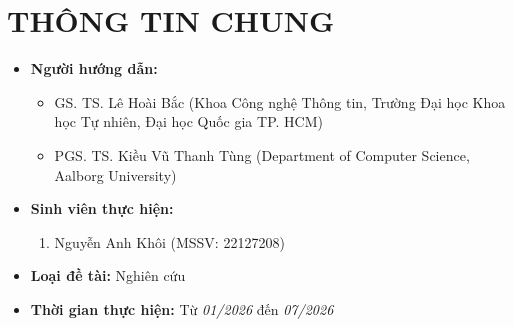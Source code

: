 \section{THÔNG TIN CHUNG}
\begin{itemize}[label = {}]
    
    \item \textbf{Người hướng dẫn:} 
    \begin{itemize}
        \item GS. TS. Lê Hoài Bắc (Khoa Công nghệ Thông tin, Trường Đại học Khoa học Tự nhiên, Đại học Quốc gia TP. HCM)
        \item PGS. TS. Kiều Vũ Thanh Tùng (Department of Computer Science, Aalborg University)
    \end{itemize}{}

    
    \item \textbf{Sinh viên thực hiện:}
    
    \begin{enumerate}
    
        \item Nguyễn Anh Khôi (MSSV: 22127208)
    \end{enumerate}

    \item \textbf{Loại đề tài:} Nghiên cứu
    
    \item \textbf{Thời gian thực hiện:} Từ \textit{01/2026} đến \textit{07/2026}
    
    
\end{itemize}

\pagebreak 

